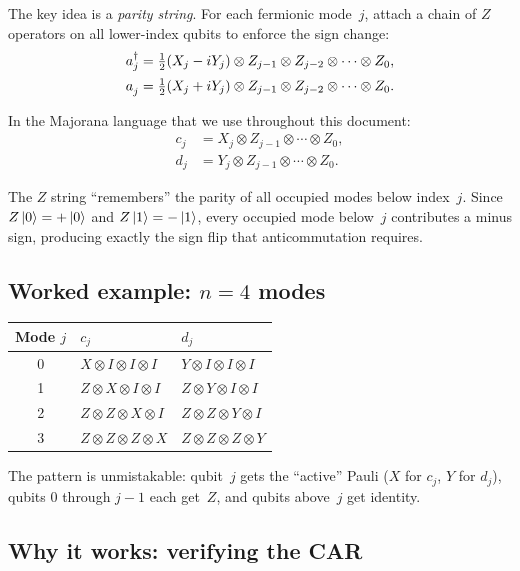 \documentclass[11pt,a4paper]{article}
\newcommand{\ad}[1]{a_{#1}^{\dagger}}
\newcommand{\an}[1]{a_{#1}^{\vphantom{\dagger}}}
\theoremstyle{definition}
\begin{document}
The key idea is a \emph{parity string}.  For each fermionic mode~$j$,
attach a chain of $Z$ operators on all lower-index qubits to enforce
the sign change:
\begin{align}
  \ad{j} &= \tfrac{1}{2}(X_j - iY_j) \otimes
    Z_{j-1} \otimes Z_{j-2} \otimes \cdots \otimes Z_0, \\
  \an{j} &= \tfrac{1}{2}(X_j + iY_j) \otimes
    Z_{j-1} \otimes Z_{j-2} \otimes \cdots \otimes Z_0.
\end{align}

In the Majorana language that we use throughout this document:
\begin{align}
  c_j &= X_j \otimes Z_{j-1} \otimes \cdots \otimes Z_0, \\
  d_j &= Y_j \otimes Z_{j-1} \otimes \cdots \otimes Z_0.
\end{align}

The $Z$ string ``remembers'' the parity of all occupied modes below
index~$j$.  Since $Z\ket{0} = +\ket{0}$ and $Z\ket{1} = -\ket{1}$,
every occupied mode below~$j$ contributes a minus sign, producing
exactly the sign flip that anticommutation requires.

\subsection*{Worked example: $n = 4$ modes}

\begin{center}
\begin{tabular}{@{}cll@{}}
\toprule
Mode $j$ & $c_j$ & $d_j$ \\
\midrule
0 & $X \otimes I \otimes I \otimes I$ &
    $Y \otimes I \otimes I \otimes I$ \\
1 & $Z \otimes X \otimes I \otimes I$ &
    $Z \otimes Y \otimes I \otimes I$ \\
2 & $Z \otimes Z \otimes X \otimes I$ &
    $Z \otimes Z \otimes Y \otimes I$ \\
3 & $Z \otimes Z \otimes Z \otimes X$ &
    $Z \otimes Z \otimes Z \otimes Y$ \\
\bottomrule
\end{tabular}
\end{center}

The pattern is unmistakable: qubit~$j$ gets the ``active'' Pauli
($X$ for $c_j$, $Y$ for $d_j$), qubits $0$ through $j{-}1$ each
get~$Z$, and qubits above~$j$ get identity.

\subsection*{Why it works: verifying the CAR}
\end{document}
